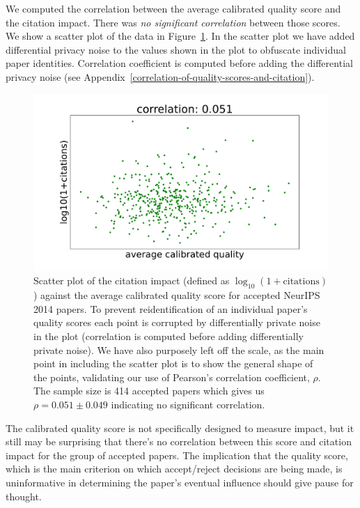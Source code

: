 \documentclass[twoside]{article}
\begin{document}
We computed the correlation between the average calibrated quality
score and the citation impact. There was \emph{no significant
  correlation} between those scores. We show a scatter plot of the
data in Figure~\ref{figure-citations-vs-average-calibrated-quality-accept}. In the
scatter plot we have added differential privacy noise to the values
shown in the plot to obfuscate individual paper
identities. Correlation coefficient is computed before adding the
differential privacy noise (see Appendix~\ref{correlation-of-quality-scores-and-citation}).

\begin{figure}[htb]
  \begin{center}
    \includegraphics[width=0.9\columnwidth]{diagrams/neurips/citations-vs-average-calibrated-quality-accept.pdf}
  \end{center}
  \caption{Scatter plot of the citation impact (defined as
    $\log_{10}(1+\text{citations})$) against the average calibrated
    quality score for accepted NeurIPS 2014 papers. To prevent
    reidentification of an individual paper's quality scores each
    point is corrupted by differentially private noise in the plot
    (correlation is computed before adding differentially private
    noise). We have also purposely left off the scale, as the main
    point in including the scatter plot is to show the general shape
    of the points, validating our use of Pearson's correlation
    coefficient, $\rho$. The sample size is 414 accepted papers which
    gives us $\rho = 0.051 \pm 0.049$ indicating no significant
    correlation.}
  \label{figure-citations-vs-average-calibrated-quality-accept}
\end{figure}

The calibrated quality score is not specifically designed to measure
impact, but it still may be surprising that there's no correlation
between this score and citation impact for the group of accepted
papers. The implication that the quality score, which is the main
criterion on which accept/reject decisions are being made, is
uninformative in determining the paper's eventual influence should
give pause for thought.
\end{document}
